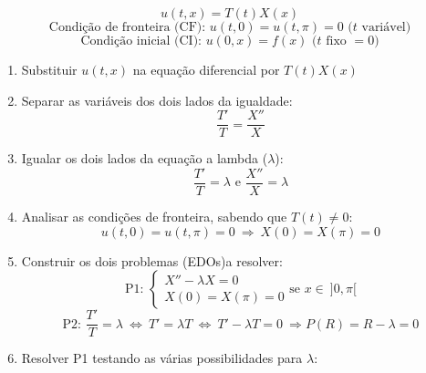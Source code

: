\documentclass[11pt, a4paper]{article}
\begin{document}
\begin{equation*}
    u(t, x) = T(t)X(x)
\end{equation*}
\begin{equation*}
    \text{Condição de fronteira (CF):\ \ } u(t, 0) = u(t, \pi) = 0 \text{\ \ ($t$ variável)}
\end{equation*}
\begin{equation*}
    \text{Condição inicial (CI):\ \ } u(0, x) = f(x) \text{\ \ ($t$ fixo $= 0$)}
\end{equation*}

\begin{enumerate}
    \item Substituir $u(t, x)$ na equação diferencial por $T(t)X(x)$
    \item Separar as variáveis dos dois lados da igualdade:
          \begin{equation*}
              \frac{T'}{T} = \frac{X''}{X}
          \end{equation*}
    \item Igualar os dois lados da equação a lambda ($\lambda$):
          \begin{equation*}
              \frac{T'}{T} = \lambda \text{\ \ \ \ e \ \ \ }
              \frac{X''}{X} = \lambda
          \end{equation*}
    \item Analisar as condições de fronteira, sabendo que $T(t) \neq 0$:
          \begin{equation*}
              u(t, 0) = u(t, \pi) = 0 \ \Rightarrow\ X(0) = X(\pi) = 0
          \end{equation*}
    \item Construir os dois problemas (EDOs)a resolver:
          \begin{equation*}
              \text{P1:\ \ \ }
              \begin{cases}
                  X'' - \lambda X = 0 \\
                  X(0) = X(\pi) = 0
              \end{cases}
              \text{se $x \in\ ]0, \pi[$}
          \end{equation*}
          \begin{equation*}
              \text{P2:\ \ \ } \frac{T'}{T} = \lambda \ \Leftrightarrow \
              T' = \lambda T \ \Leftrightarrow \
              T' - \lambda T = 0 \ \Rightarrow
              P(R) = R-\lambda = 0
          \end{equation*}
    \item Resolver P1 testando as várias possibilidades para $\lambda$:

\end{enumerate}
\end{document}
